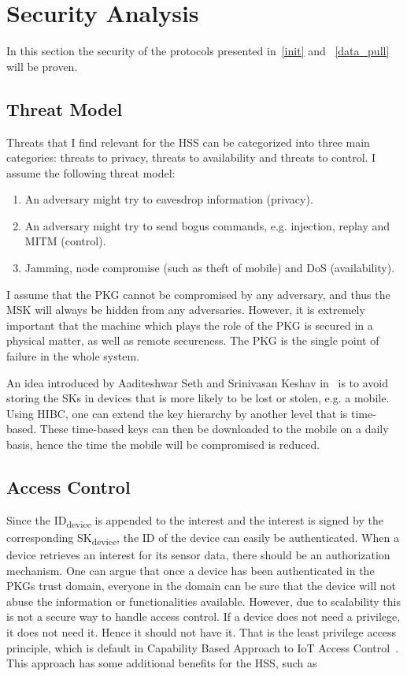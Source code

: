 \section{Security Analysis}
In this section the security of the protocols presented in~\autoref{init} and ~\autoref{data_pull} will be proven.

\subsection{Threat Model}
Threats that I find relevant for the \gls{HSS} can be categorized into three main categories: threats to privacy, threats to availability and threats to control.
I assume the following threat model:
\begin{enumerate}
  \item An adversary might try to eavesdrop information (privacy).
  \item An adversary might try to send bogus commands, e.g. injection, replay and \gls{MITM} (control).
  \item Jamming, node compromise (such as theft of mobile) and \gls{DoS} (availability).
\end{enumerate}

I assume that the \gls{PKG} cannot be compromised by any adversary, and thus the \gls{MSK} will always be hidden from any adversaries. 
However, it is extremely important that the machine which plays the role of the \gls{PKG} is secured in a physical matter, as well as remote secureness. 
The \gls{PKG} is the single point of failure in the whole system.

An idea introduced by Aaditeshwar Seth and Srinivasan Keshav in~\cite[Section 5.4]{Seth:2005:PSD:1897159.1897165} is to avoid storing the \gls{SK}s in devices that is more likely to be lost or stolen, e.g. a mobile.
Using \gls{HIBC}, one can extend the key hierarchy by another level that is time-based.
These time-based keys can then be downloaded to the mobile on a daily basis, hence the time the mobile will be compromised is reduced.

\subsection{Access Control}\label{access_control}
Since the ID\textsubscript{device} is appended to the \gls{interest} and the \gls{interest} is signed by the corresponding SK\textsubscript{device}, the \gls{ID} of the device can easily be authenticated. 
When a device retrieves an \gls{interest} for its sensor \gls{data}, there should be an authorization mechanism. 
One can argue that once a device has been authenticated in the \gls{PKG}s trust domain, everyone in the domain can be sure that the device will not abuse the information or functionalities available. 
However, due to scalability this is not a secure way to handle access control. 
If a device does not need a privilege, it does not need it.
Hence it should not have it. 
That is the least privilege access principle, which is default in Capability Based Approach to \gls{IoT} Access Control~\cite{DBLP:conf/imis/GusmeroliPR12}.
This approach has some additional benefits for the \gls{HSS}, such as

